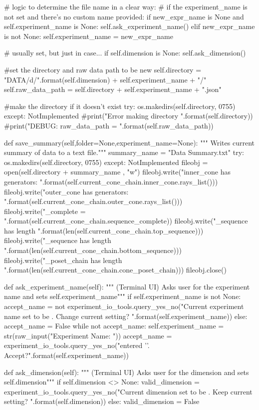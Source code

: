 \documentclass{TC}
\begin{document}
\begin{SAGE}
		# logic to determine the file name in a clear way:
		# if the experiment_name is not set and there's no custom name provided:
		if new_expr_name is None and self.experiment_name is None:
			self.ask_experiment_name()
		elif new_expr_name is not None:
			self.experiment_name = new_expr_name

		# usually set, but just in case...
		if self.dimension is None:
			self.ask_dimension()

		#set the directory and raw data path to be new
		self.directory = "DATA/{}d/".format(self.dimension) + self.experiment_name + "/"
		self.raw_data_path = self.directory + self.experiment_name + ".json"

		#make the directory if it doesn't exist
		try:
			os.makedirs(self.directory, 0755) 
		except:
			NotImplemented
			#print("Error making directory {}".format(self.directory))
		#print("DEBUG: raw_data_path = {}".format(self.raw_data_path))
				
	def save_summary(self,folder=None,experiment_name=None):
		""" Writes current summary of data to a text file.""" 
		summary_name = "Data Summary.txt"
		try:
			os.makedirs(self.directory, 0755) 
		except:
			NotImplemented
		fileobj = open(self.directory + summary_name , "w")
		fileobj.write("inner_cone has generators: \n{}\n".format(self.current_cone_chain.inner_cone.rays_list()))
		fileobj.write("outer_cone has generators: \n{}\n".format(self.current_cone_chain.outer_cone.rays_list()))
		fileobj.write("\tsequence_complete = {}\n".format(self.current_cone_chain.sequence_complete))
		fileobj.write("\ttop_sequence has length {}\n".format(len(self.current_cone_chain.top_sequence)))
		fileobj.write("\tbottom_sequence has length {}\n".format(len(self.current_cone_chain.bottom_sequence)))
		fileobj.write("\tcone_poset_chain has length {}\n".format(len(self.current_cone_chain.cone_poset_chain)))
		fileobj.close()

	def ask_experiment_name(self):
		""" (Terminal UI) Asks user for the experiment name and sets self.experiment_name"""
		if self.experiment_name is not None:
			accept_name = not experiment_io_tools.query_yes_no("Current experiment name set to be {}. Change current setting? ".format(self.experiment_name))
		else:
			accept_name = False
		while not accept_name:
			self.experiment_name = str(raw_input("Experiment Name: "))
			accept_name = experiment_io_tools.query_yes_no("\tYou entered '{}'. Accept?".format(self.experiment_name))


	def ask_dimension(self):
		""" (Terminal UI) Asks user for the dimension and sets self.dimension"""
		if self.dimension <> None:
			valid_dimension = experiment_io_tools.query_yes_no("Current dimension set to be {}. Keep current setting? ".format(self.dimension))
		else:
			valid_dimension = False


\end{SAGE}
\end{document}
